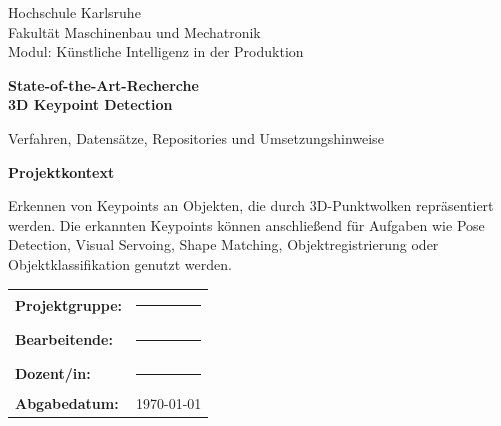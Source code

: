 \documentclass[11pt,a4paper]{article}
\begin{document}
\begin{titlepage}
    \centering
    \vspace*{1.2cm}
    {\Large Hochschule Karlsruhe\\[0.2cm]
    Fakultät Maschinenbau und Mechatronik\\[0.2cm]
    Modul: Künstliche Intelligenz in der Produktion\par}
    \vspace{2.0cm}
    {\Huge\bfseries State-of-the-Art-Recherche\\[0.25cm]
    3D Keypoint Detection\par}
    \vspace{0.7cm}
    {\Large Verfahren, Datensätze, Repositories und Umsetzungshinweise\par}
    \vspace{1.8cm}
    \begin{tcolorbox}[width=0.88\textwidth]
    \centering
    \textbf{Projektkontext}\par
    Erkennen von Keypoints an Objekten, die durch 3D-Punktwolken repräsentiert werden. Die erkannten Keypoints können anschließend für Aufgaben wie Pose Detection, Visual Servoing, Shape Matching, Objektregistrierung oder Objektklassifikation genutzt werden.
    \end{tcolorbox}
    \vfill
    \begin{tabular}{ll}
        \textbf{Projektgruppe:} & \rule{8cm}{0.4pt}\\[0.25cm]
        \textbf{Bearbeitende:} & \rule{8cm}{0.4pt}\\[0.25cm]
        \textbf{Dozent/in:} & \rule{8cm}{0.4pt}\\[0.25cm]
        \textbf{Abgabedatum:} & \today\\
    \end{tabular}
    \vspace{1.0cm}
\end{titlepage}

\begin{abstract}
Diese Dokumentation dient als strukturierte Einarbeitung in ausgewählte Verfahren der 3D Keypoint Detection. Im Fokus stehen Methoden, für die neben der wissenschaftlichen Veröffentlichung auch ein öffentliches Code-Repository verfügbar ist. Dadurch soll die spätere praktische Umsetzung, das Nachtrainieren auf KeypointNet und die Evaluation im Rahmen des Projekts vorbereitet werden. Die Darstellung ist bewusst erklärend gehalten: Zu jedem Verfahren werden Problemstellung, Grundidee, Modellarchitektur, Trainingsprinzip, Datennutzung, Repositorium und mögliche Projektrelevanz beschrieben. Die Dokumentation ist keine vollständige systematische Literaturstudie, sondern eine fokussierte Wissensbasis zur begründeten Auswahl einer umsetzbaren Methode.
\end{abstract}
\end{document}
